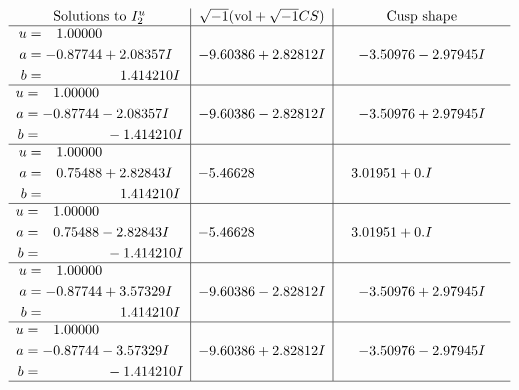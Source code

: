 \documentclass[1p]{elsarticle_modified}
\theoremstyle{definition}
\newcommand{\I}{\sqrt{-1}}
\begin{document}
$$\begin{array}{c|c|c}  
\text{Solutions to }I^u_{2}& \I (\text{vol} + \sqrt{-1}CS) & \text{Cusp shape}\\
 \hline 
\begin{aligned}
u &= \phantom{-}1.00000\phantom{ +0.000000I} \\
a &= -0.87744 + 2.08357 I \\
b &= \phantom{-0.000000 -}1.414210 I\end{aligned}
 & -9.60386 + 2.82812 I & -3.50976 - 2.97945 I \\ \hline\begin{aligned}
u &= \phantom{-}1.00000\phantom{ +0.000000I} \\
a &= -0.87744 - 2.08357 I \\
b &= \phantom{-0.000000 } -1.414210 I\end{aligned}
 & -9.60386 - 2.82812 I & -3.50976 + 2.97945 I \\ \hline\begin{aligned}
u &= \phantom{-}1.00000\phantom{ +0.000000I} \\
a &= \phantom{-}0.75488 + 2.82843 I \\
b &= \phantom{-0.000000 -}1.414210 I\end{aligned}
 & -5.46628\phantom{ +0.000000I} & \phantom{-}3.01951 + 0. I\phantom{ +0.000000I} \\ \hline\begin{aligned}
u &= \phantom{-}1.00000\phantom{ +0.000000I} \\
a &= \phantom{-}0.75488 - 2.82843 I \\
b &= \phantom{-0.000000 } -1.414210 I\end{aligned}
 & -5.46628\phantom{ +0.000000I} & \phantom{-}3.01951 + 0. I\phantom{ +0.000000I} \\ \hline\begin{aligned}
u &= \phantom{-}1.00000\phantom{ +0.000000I} \\
a &= -0.87744 + 3.57329 I \\
b &= \phantom{-0.000000 -}1.414210 I\end{aligned}
 & -9.60386 - 2.82812 I & -3.50976 + 2.97945 I \\ \hline\begin{aligned}
u &= \phantom{-}1.00000\phantom{ +0.000000I} \\
a &= -0.87744 - 3.57329 I \\
b &= \phantom{-0.000000 } -1.414210 I\end{aligned}
 & -9.60386 + 2.82812 I & -3.50976 - 2.97945 I\\
 \hline 
 \end{array}$$\newpage\newpage\renewcommand{\arraystretch}{1}
\end{document}
